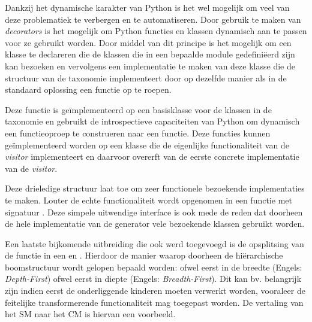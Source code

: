 Dankzij het dynamische karakter van Python is het wel mogelijk om veel
van deze problematiek te verbergen en te automatiseren. Door gebruik te maken
van \emph{decorators} is het mogelijk om Python functies en klassen dynamisch
aan te passen voor ze gebruikt worden. Door middel van dit principe is het
mogelijk om een klasse te declareren die de klassen die in een bepaalde module
gedefini\"eerd zijn kan bezoeken en vervolgens een implementatie te maken van
deze klasse die de structuur van de taxonomie implementeert door op dezelfde
manier als in de standaard oplossing een  functie op te roepen.

Deze  functie is ge\"implementeerd op een basisklasse voor de
klassen in de taxonomie en gebruikt de introspectieve capaciteiten van Python
om dynamisch een functieoproep te construeren naar een 
functie. Deze functies kunnen ge\"implementeerd worden op een klasse die de
eigenlijke functionaliteit van de \emph{visitor} implementeert en daarvoor
overerft van de eerste concrete implementatie van de \emph{visitor}.

Deze drieledige structuur laat toe om zeer functionele bezoekende
implementaties te maken. Louter de echte functionaliteit wordt opgenomen in een
functie met signatuur . Deze simpele uitwendige interface
is ook mede de reden dat doorheen de hele implementatie van de generator vele
bezoekende klassen gebruikt worden.

Een laatste bijkomende uitbreiding die ook werd toegevoegd is de opsplitsing
van de  functie in een  en
. Hierdoor de manier waarop doorheen de
hi\"erarchische boomstructuur wordt gelopen bepaald worden: ofwel eerst in de
breedte (Engels: \emph{Depth-First}) ofwel eerst in diepte (Engels:
\emph{Breadth-First}). Dit kan bv. belangrijk zijn indien eerst de
onderliggende kinderen moeten verwerkt worden, vooraleer de feitelijke
transformerende functionaliteit mag toegepast worden. De vertaling van het SM
naar het CM is hiervan een voorbeeld.

